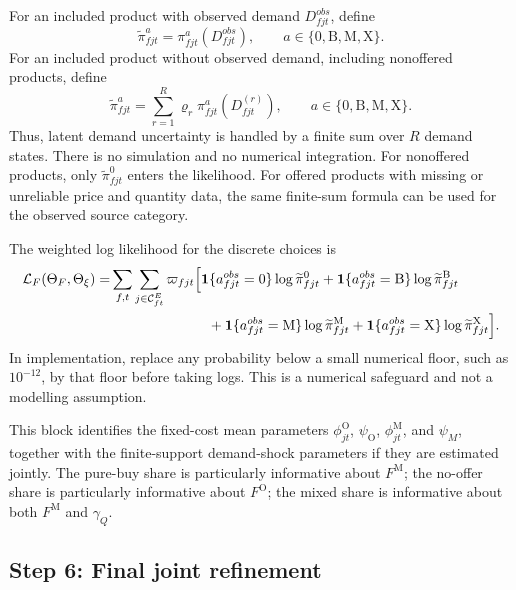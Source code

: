 \documentclass[11pt,a4paper]{article}
\newcommand{\one}{\mathbf{1}}
\newcommand{\mc}{\mathcal}
\newcommand{\M}{\mathrm{M}}
\newcommand{\B}{\mathrm{B}}
\newcommand{\X}{\mathrm{X}}
\newcommand{\OFC}{\mathrm{O}}
\begin{document}
For an included product with observed demand $D^{obs}_{fjt}$, define
\begin{equation}
    \widetilde\pi^a_{fjt}=\pi^a_{fjt}(D^{obs}_{fjt}),
    \qquad a\in\{0,\B,\M,\X\}.
    \label{eq:pi_observed_D}
\end{equation}
For an included product without observed demand, including nonoffered products, define
\begin{equation}
    \widetilde\pi^a_{fjt}
    =\sum_{r=1}^R \varrho_r\pi^a_{fjt}(D^{(r)}_{fjt}),
    \qquad a\in\{0,\B,\M,\X\}.
    \label{eq:pi_latent_D}
\end{equation}
Thus, latent demand uncertainty is handled by a finite sum over $R$ demand states. There is no simulation and no numerical integration. For nonoffered products, only $\widetilde\pi^0_{fjt}$ enters the likelihood. For offered products with missing or unreliable price and quantity data, the same finite-sum formula can be used for the observed source category.

The weighted log likelihood for the discrete choices is
\begin{align}
    \mc{L}_F(\Theta_F,\Theta_\xi)
    =&\sum_{f,t}\sum_{j\in\mc{C}^{E}_{ft}}\varpi_{fjt}
    \Big[
        \one\{a^{obs}_{fjt}=0\}\log \widetilde\pi^0_{fjt}
        +\one\{a^{obs}_{fjt}=\B\}\log \widetilde\pi^{\B}_{fjt} \notag\\
    &\hspace{7em}
        +\one\{a^{obs}_{fjt}=\M\}\log \widetilde\pi^{\M}_{fjt}
        +\one\{a^{obs}_{fjt}=\X\}\log \widetilde\pi^{\X}_{fjt}
    \Big].
    \label{eq:fixed_likelihood}
\end{align}
In implementation, replace any probability below a small numerical floor, such as $10^{-12}$, by that floor before taking logs. This is a numerical safeguard and not a modelling assumption.

This block identifies the fixed-cost mean parameters $\phi^{\OFC}_{jt}$, $\psi_{\OFC}$, $\phi^{\M}_{jt}$, and $\psi_M$, together with the finite-support demand-shock parameters if they are estimated jointly. The pure-buy share is particularly informative about $F^{\M}$; the no-offer share is particularly informative about $F^{\OFC}$; the mixed share is informative about both $F^{\M}$ and $\gamma_Q$.

\subsection{Step 6: Final joint refinement}
\end{document}
